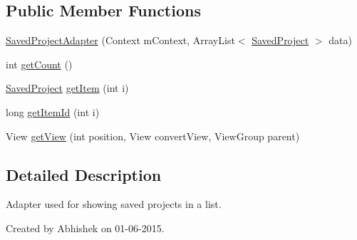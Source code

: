 \subsection*{Public Member Functions}
\begin{DoxyCompactItemize}
\item 
\hyperlink{classorg_1_1buildmlearn_1_1toolkit_1_1adapter_1_1SavedProjectAdapter_a8a42e7c094f6ce608a5bfb1e5e79a11f}{Saved\-Project\-Adapter} (Context m\-Context, Array\-List$<$ \hyperlink{classorg_1_1buildmlearn_1_1toolkit_1_1model_1_1SavedProject}{Saved\-Project} $>$ data)
\item 
int \hyperlink{classorg_1_1buildmlearn_1_1toolkit_1_1adapter_1_1SavedProjectAdapter_a143869cd5a7b07ef9891db54b7aadd94}{get\-Count} ()
\item 
\hyperlink{classorg_1_1buildmlearn_1_1toolkit_1_1model_1_1SavedProject}{Saved\-Project} \hyperlink{classorg_1_1buildmlearn_1_1toolkit_1_1adapter_1_1SavedProjectAdapter_ae1b4a43ad80a736a832e74164a538e71}{get\-Item} (int i)
\item 
long \hyperlink{classorg_1_1buildmlearn_1_1toolkit_1_1adapter_1_1SavedProjectAdapter_ae1ad9d54393c2f9187c9e5bce00bcea3}{get\-Item\-Id} (int i)
\item 
View \hyperlink{classorg_1_1buildmlearn_1_1toolkit_1_1adapter_1_1SavedProjectAdapter_a80768fbb566b6f75f2e8c699122dcbc2}{get\-View} (int position, View convert\-View, View\-Group parent)
\end{DoxyCompactItemize}


\subsection{Detailed Description}
Adapter used for showing saved projects in a list. 

Created by Abhishek on 01-\/06-\/2015. 

